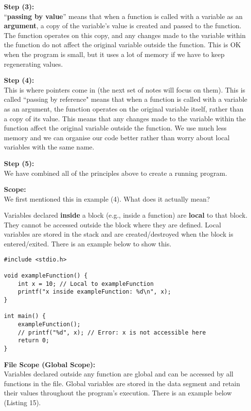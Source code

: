 \documentclass[a4paper,12pt]{article}
\begin{document}
\textbf{Step (3):}\\
``\textbf{passing by value}” means that when a function is called with a variable as an \textbf{argument}, a copy of the variable’s value is created and passed to the function. The function operates on this copy, and any changes made to the variable within the function do not affect the original variable outside the function. This is OK when the program is small, but it uses a lot of memory if we have to keep regenerating values.

\textbf{Step (4):}\\
This is where pointers come in (the next set of notes will focus on them). This is called ``passing by reference" means that when a function is called with a variable as an argument, the function operates on the original variable itself, rather than a copy of its value. This means that any changes made to the variable within the function affect the original variable outside the function. We use much less memory and we can organise our code better rather than worry about local variables with the same name. 

\textbf{Step (5):}\\
We have combined all of the principles above to create a running program.

\textbf{Scope:}\\
We first mentioned this in example (4). What does it actually mean? 

Variables declared \textbf{inside} a block (e.g., inside a function) are \textbf{local} to that block. They cannot be accessed outside the block where they are defined.
Local variables are stored in the stack and are created/destroyed when the block is entered/exited. There is an example below to show this.\\

\lstset{language=C}
\begin{lstlisting}[caption=Void example]
#include <stdio.h>

void exampleFunction() {
    int x = 10; // Local to exampleFunction
    printf("x inside exampleFunction: %d\n", x);
}

int main() {
    exampleFunction();
    // printf("%d", x); // Error: x is not accessible here
    return 0;
}\end{lstlisting}

\textbf{File Scope (Global Scope):}\\
Variables declared outside any function are global and can be accessed by all functions in the file. Global variables are stored in the data segment and retain their values throughout the program's execution. There is an example below (Listing 15).
\end{document}
